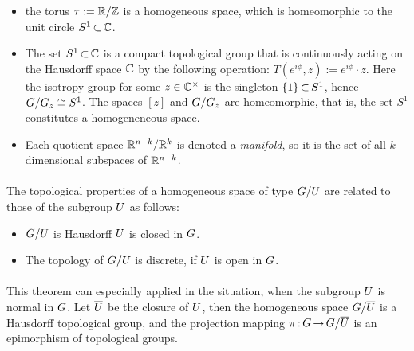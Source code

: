 \documentclass[11pt,twoside]{article}
\begin{document}
\begin{itemize}[leftmargin=22pt]
\item[1.]
the torus $\tau := {\mathbb{R}} / {\mathbb{Z}}$ is a homogeneous space,
which is homeomorphic to the unit circle $S^1 {\,\subset\,} {\mathbb{C}}$.

\item[2.]
The set $S^1 {\,\subset\,} {\mathbb{C}}$ is a compact topological group
that is continuously acting on the Hausdorff space ${\mathbb{C}}$ by the following operation:
$T(e^{i \phi},z) := e^{i \phi} \cdot z$.
Here the isotropy group for some $z \in {\mathbb{C}}^{\times}$
is the singleton $\{1\} {\,\subset\,} S^1$,
hence $G/G_z \cong S^1$.
The spaces $[z]$ and $G/G_z$ are homeomorphic,
that is,
the set $S^1$ constitutes a homogeneneous space.

\item[3.]
Each quotient space ${\mathbb{R}}^{n+k}/{\mathbb{R}}^k$ is denoted a \textit{{\GRASSMANN} manifold},
so it is the set of all
$k$-dimensional subspaces of ${\mathbb{R}}^{n+k}$.
\end{itemize}

\paragraph{}
The topological properties of a homogeneous space of type $G/U$
are related to those of the subgroup $U$ as follows:

\begin{itemize}[leftmargin=22pt]
\item[1.]
$G/U$ is Hausdorff \iff
$U$ is closed in $G$.

\item[2.]
The topology of $G/U$ is discrete,
if $U$ is open in $G$.
\end{itemize}

\paragraph{}
This theorem can especially applied in the situation,
when the subgroup $U$ is normal in $G$.
Let $\overline{U}$ be the closure of $U$,
then the homogeneous space $G/\overline{U}$ is a
Hausdorff topological group,
and the projection mapping $\pi {\,:\,} G {\,\to\,} G/\overline{U}$ is
an epimorphism of topological groups.

\end{document}
